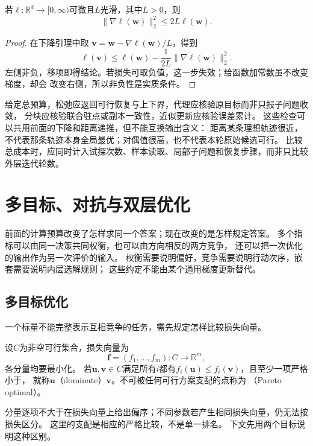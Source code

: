 \begin{lemma}[非负光滑函数的梯度自界]
\label{lem:opt-self-bounding}
若$\ell:\mathbb{R}^d\to[0,\infty)$可微且$L$光滑，其中$L>0$，则
\[
  \lVert\nabla\ell(\bm{w})\rVert_2^2\leq2L\ell(\bm{w}).
\]
\end{lemma}

\begin{proof}
在下降引理中取
$\bm{v}=\bm{w}-\nabla\ell(\bm{w})/L$，得到
\[
  \ell(\bm{v})
  \leq\ell(\bm{w})-\frac{1}{2L}
  \lVert\nabla\ell(\bm{w})\rVert_2^2.
\]
左侧非负，移项即得结论。若损失可取负值，这一步失效；给函数加常数虽不改变梯度，却会
改变右侧，所以非负性是实质条件。
\end{proof}

给定总预算，松弛应返回可行恢复与上下界，代理应核验原目标而非只报子问题收敛，
分块应核验联合驻点或副本一致性，近似更新应核验误差累计。
这些检查可以共用前面的下降和距离递推，但不能互换输出含义：
距离某条理想轨迹很近，不代表那条轨迹本身全局最优；对偶值很高，也不代表本轮原始候选可行。
比较总成本时，应同时计入试探次数、样本读取、局部子问题和恢复步骤，而非只比较外层迭代轮数。

\section{多目标、对抗与双层优化}
\label{sec:opt-decomposition-multiple-levels}

前面的计算预算改变了怎样求同一个答案；现在改变的是怎样规定答案。
多个指标可以由同一决策共同权衡，也可以由方向相反的两方竞争，
还可以把一次优化的输出作为另一次评价的输入。
权衡需要说明偏好，竞争需要说明行动次序，嵌套需要说明内层选解规则；
这些约定不能由某个通用梯度更新替代。

\subsection{多目标优化}
\label{sec:opt-multiobjective-saddle}

一个标量不能完整表示互相竞争的任务，需先规定怎样比较损失向量。
\begin{definition}[支配与Pareto最优]
\label{def:opt-pareto-optimality}
设$C$为非空可行集合，损失向量为
\[
 \bm f=(f_1,\ldots,f_m):C\to\mathbb R^m,
\]
各分量均要最小化。
若$\bm u,\bm v\in C$满足所有$i$都有$f_i(\bm u)\leq f_i(\bm v)$，且至少一项严格小于，
就称$\bm u$（dominate）$\bm v$。不可被任何可行方案支配的点称为
（Pareto optimal）。
\end{definition}
分量逐项不大于在损失向量上给出偏序；不同参数若产生相同损失向量，仍无法按损失区分。
这里的支配是相应的严格比较，不是单一排名。
下文先用两个目标说明这种区别。

